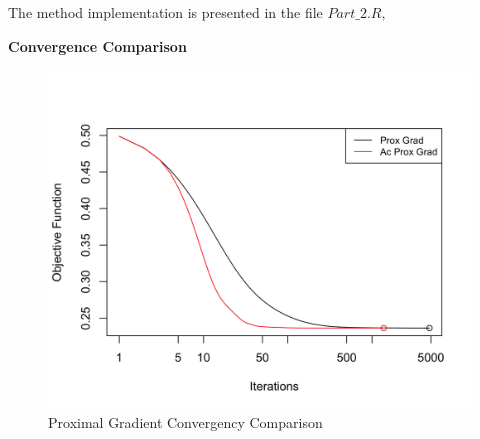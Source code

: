 \documentclass[11 pt]{article}
\begin{document}
\begin{enumerate}[label=(\Alph*)]
	\newpage
	The method implementation is presented in the file $Part\_2.R$,
	\vspace{2mm}
	
	
	
	\newpage
	\textbf{Convergence Comparison}
	
		\begin{figure}[H]
		\begin{center}
			\includegraphics[width=0.8\linewidth]{R_Code/Convergency.png}
			\caption{\small Proximal Gradient Convergency Comparison
			}
		\end{center}
	\end{figure}


	\end{enumerate}
\end{document}

